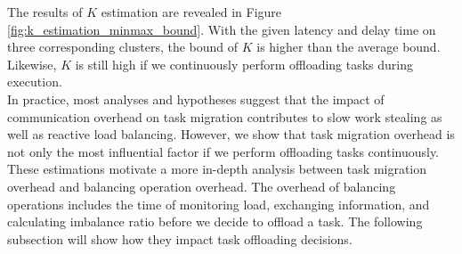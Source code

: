 The results of $K$ estimation are revealed in Figure \ref{fig:k_estimation_minmax_bound}. With the given latency and delay time on three corresponding clusters, the bound of $K$ is higher than the average bound. Likewise, $K$ is still high if we continuously perform offloading tasks during execution.\\

In practice, most analyses and hypotheses suggest that the impact of communication overhead on task migration contributes to slow work stealing as well as reactive load balancing. However, we show that task migration overhead is not only the most influential factor if we perform offloading tasks continuously. These estimations motivate a more in-depth analysis between task migration overhead and balancing operation overhead. The overhead of balancing operations includes the time of monitoring load, exchanging information, and calculating imbalance ratio before we decide to offload a task. The following subsection will show how they impact task offloading decisions.



